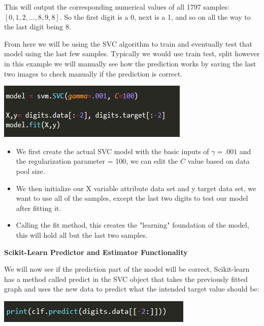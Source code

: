 \documentclass[a4paper,12pt]{report}
\newcommand{\msection}[1]{\noindent\textbf{#1}}
\begin{document}
This will output the corresponding numerical values of all 1797 samples: $[0, 1, 2, ..., 8, 9, 8]$. So the first digit is a 0, next is a 1, and so on all the way to the last digit being 8.

From here we will be using the SVC algorithm to train and eventually test that model using the last few samples. Typically we would use train test, split however in this example we will manually see how the prediction works by saving the last two images to check manually if the prediction is correct.

\begin{center}
    \captionsetup{type=figure}
    \includegraphics[width=.5\linewidth]{media/svmSVC.png}
\end{center}

\begin{itemize}[,]
    \setlength\itemsep{-.1cm}
    \item We first create the actual SVC model with the basic inputs of $\gamma = .001$ and the regularization parameter = 100, we can edit the $C$ value based on data pool size.
    \item We then initialize our X variable attribute data set and y target data set, we want to use all of the samples, except the last two digits to test our model after fitting it.
    \item Calling the fit method, this creates the "learning" foundation of the model, this will hold all but the last two samples.
\end{itemize}

\msection{Scikit-Learn Predictor and Estimator Functionality}

We will now see if the prediction part of the model will be correct, Scikit-learn has a method called predict in the SVC object that takes the previously fitted graph and uses the new data to predict what the intended target value should be:

\begin{center}
    \captionsetup{type=figure}
    \includegraphics[width=.5\linewidth]{media/CLFpredict.png}
\end{center}
\end{document}
